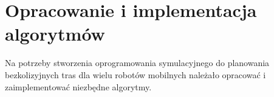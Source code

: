\chapter{Opracowanie i implementacja algorytmów}
\label{ch:alg-impl}

Na potrzeby stworzenia oprogramowania symulacyjnego do planowania bezkolizyjnych tras dla wielu robotów mobilnych należało opracować i zaimplementować niezbędne algorytmy.